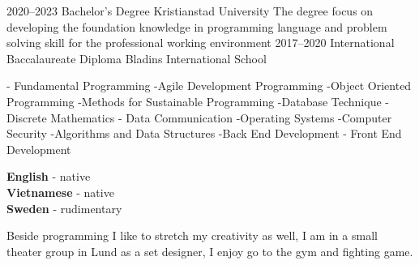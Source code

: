 \documentclass[9pt]{developercv} %
\begin{document}
\begin{entrylist}
	\entry
		{2020--2023}
		{Bachelor's Degree}
		{Kristianstad University}
		{The degree focus on developing the foundation knowledge in programming language and problem solving skill for the professional working environment}
	\entry
		{2017--2020}
		{International Baccalaureate Diploma }
		{Bladins International School}

\end{entrylist}

\begin{entrylist}
    {- Fundamental Programming -Agile Development Programming -Object Oriented Programming -Methods for Sustainable Programming -Database Technique - Discrete Mathematics}
    {- Data Communication -Operating Systems -Computer Security -Algorithms and Data Structures -Back End Development - Front End Development}
\end{entrylist}




\begin{minipage}[t]{0.3\textwidth}
	\vspace{-\baselineskip} %

	
	\textbf{English} - native\\
	\textbf{Vietnamese} - native\\
	\textbf{Sweden} - rudimentary
\end{minipage}
\hfill
\begin{minipage}[t]{0.6\textwidth}
	\vspace{-\baselineskip} %
	
	
	Beside programming I like to stretch my creativity as well, I am in a small theater group in Lund as a set designer, I enjoy go to the gym and fighting game.
	\end{minipage}


\end{document}
